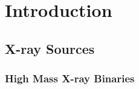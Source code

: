 
\chapter{Introduction} %

\label{ch:introduction} %


\section{X-ray Sources}


\subsection{High Mass X-ray Binaries}